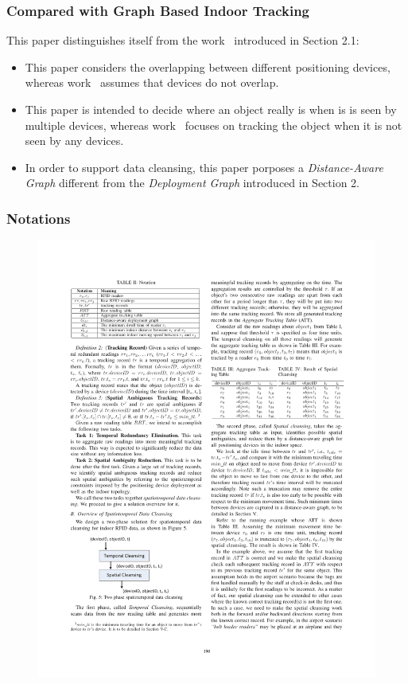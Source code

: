 
\begin{frame}
\frametitle{Compared with Graph Based Indoor Tracking~\cite{DBLP:conf/mdm/JensenLY09}}

This paper distinguishes itself from the work~\cite{DBLP:conf/mdm/JensenLY09} introduced in Section 2.1:

\begin{itemize}
  \item This paper considers the overlapping between different positioning devices, whereas work~\cite{DBLP:conf/mdm/JensenLY09} assumes that devices do not overlap.
  \item This paper is intended to decide where an object really is when is is seen by multiple devices, whereas work~\cite{DBLP:conf/mdm/JensenLY09} focuses on tracking the object when it is not seen by any devices.
  \item In order to support data cleansing, this paper porposes a \emph{Distance-Aware Graph} different from the \emph{Deployment Graph} introduced in Section 2.
\end{itemize}

\end{frame}


\begin{frame}
\frametitle{Notations}

\begin{figure}[tb]
  \includegraphics[width=\columnwidth]{figures/3-2/3-2-3.pdf}
\end{figure}

\end{frame}

